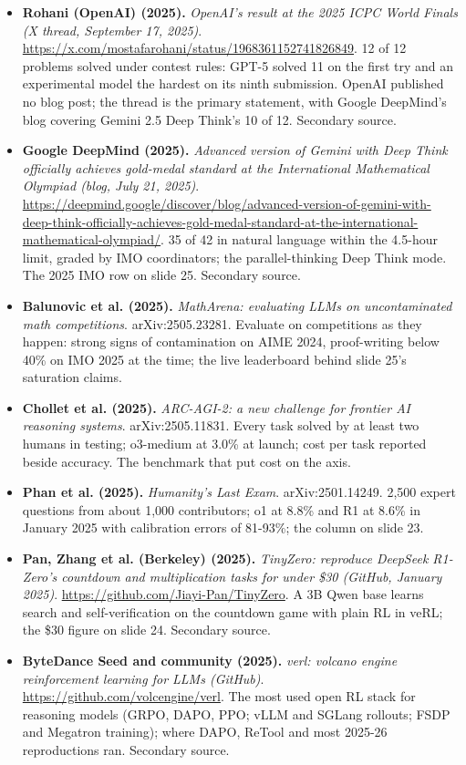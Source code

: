 \begin{itemize}[leftmargin=1.2em,itemsep=3pt]
\item \textbf{Rohani (OpenAI) (2025).} \textit{OpenAI's result at the 2025 ICPC World Finals (X thread, September 17, 2025)}. \url{https://x.com/mostafarohani/status/1968361152741826849}. 12 of 12 problems solved under contest rules: GPT-5 solved 11 on the first try and an experimental model the hardest on its ninth submission. OpenAI published no blog post; the thread is the primary statement, with Google DeepMind's blog covering Gemini 2.5 Deep Think's 10 of 12. Secondary source.
\item \textbf{Google DeepMind (2025).} \textit{Advanced version of Gemini with Deep Think officially achieves gold-medal standard at the International Mathematical Olympiad (blog, July 21, 2025)}. \url{https://deepmind.google/discover/blog/advanced-version-of-gemini-with-deep-think-officially-achieves-gold-medal-standard-at-the-international-mathematical-olympiad/}. 35 of 42 in natural language within the 4.5-hour limit, graded by IMO coordinators; the parallel-thinking Deep Think mode. The 2025 IMO row on slide 25. Secondary source.
\item \textbf{Balunovic et al. (2025).} \textit{MathArena: evaluating LLMs on uncontaminated math competitions}. arXiv:2505.23281. Evaluate on competitions as they happen: strong signs of contamination on AIME 2024, proof-writing below 40\% on IMO 2025 at the time; the live leaderboard behind slide 25's saturation claims.
\item \textbf{Chollet et al. (2025).} \textit{ARC-AGI-2: a new challenge for frontier AI reasoning systems}. arXiv:2505.11831. Every task solved by at least two humans in testing; o3-medium at 3.0\% at launch; cost per task reported beside accuracy. The benchmark that put cost on the axis.
\item \textbf{Phan et al. (2025).} \textit{Humanity's Last Exam}. arXiv:2501.14249. 2,500 expert questions from about 1,000 contributors; o1 at 8.8\% and R1 at 8.6\% in January 2025 with calibration errors of 81-93\%; the column on slide 23.
\item \textbf{Pan, Zhang et al. (Berkeley) (2025).} \textit{TinyZero: reproduce DeepSeek R1-Zero's countdown and multiplication tasks for under \$30 (GitHub, January 2025)}. \url{https://github.com/Jiayi-Pan/TinyZero}. A 3B Qwen base learns search and self-verification on the countdown game with plain RL in veRL; the \$30 figure on slide 24. Secondary source.
\item \textbf{ByteDance Seed and community (2025).} \textit{verl: volcano engine reinforcement learning for LLMs (GitHub)}. \url{https://github.com/volcengine/verl}. The most used open RL stack for reasoning models (GRPO, DAPO, PPO; vLLM and SGLang rollouts; FSDP and Megatron training); where DAPO, ReTool and most 2025-26 reproductions ran. Secondary source.
\end{itemize}
